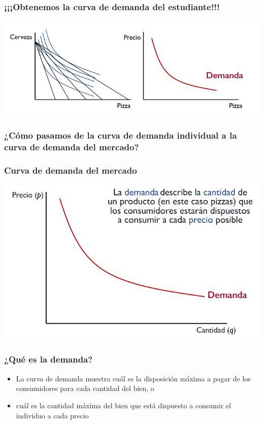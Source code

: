 \documentclass{beamer}
\begin{document}
\begin{frame}
\frametitle{¡¡¡Obtenemos la curva de demanda del estudiante!!!}
\centering
\includegraphics[scale=0.6]{Figures/Tema_02.57_derivacioncurvademanda4.png}
\end{frame}

\begin{frame}
\frametitle{ ¿Cómo pasamos de la curva de demanda individual a la curva de demanda del mercado?}

\end{frame}

\begin{frame}
\frametitle{Curva de demanda del mercado}
\centering
\includegraphics[scale=0.6]{Figures/Tema_02.58_demanda.png}
\end{frame}

\begin{frame}
\frametitle{¿Qué es la demanda?}
\begin{itemize}
    \item La curva de demanda muestra cuál es la disposición máxima a pagar de los consumidores para cada cantidad del bien, o
    \item cuál es la cantidad máxima del bien que está dispuesto a consumir el individuo a cada precio
\end{itemize}
\end{frame}
\end{document}
